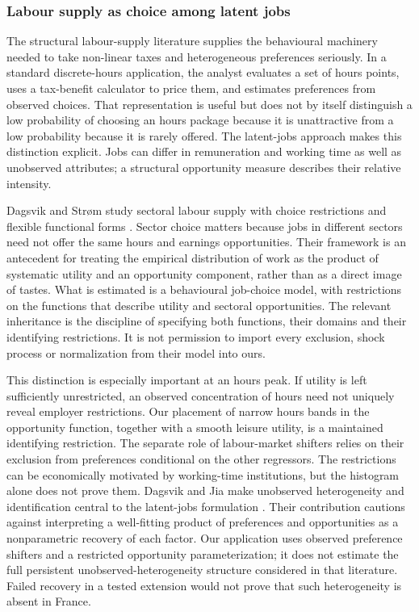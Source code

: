 \documentclass[11pt,a4paper]{article}
\begin{document}
\subsubsection{Labour supply as choice among latent jobs}\label{labour-supply-as-choice-among-latent-jobs}

The structural labour-supply literature supplies the behavioural machinery needed to take non-linear taxes and heterogeneous preferences seriously. In a standard discrete-hours application, the analyst evaluates a set of hours points, uses a tax-benefit calculator to price them, and estimates preferences from observed choices. That representation is useful but does not by itself distinguish a low probability of choosing an hours package because it is unattractive from a low probability because it is rarely offered. The latent-jobs approach makes this distinction explicit. Jobs can differ in remuneration and working time as well as unobserved attributes; a structural opportunity measure describes their relative intensity.

Dagsvik and Strøm study sectoral labour supply with choice restrictions and flexible functional forms \citep[model exposition]{dagsvikstrom2006}. Sector choice matters because jobs in different sectors need not offer the same hours and earnings opportunities. Their framework is an antecedent for treating the empirical distribution of work as the product of systematic utility and an opportunity component, rather than as a direct image of tastes. What is estimated is a behavioural job-choice model, with restrictions on the functions that describe utility and sectoral opportunities. The relevant inheritance is the discipline of specifying both functions, their domains and their identifying restrictions. It is not permission to import every exclusion, shock process or normalization from their model into ours.

This distinction is especially important at an hours peak. If utility is left sufficiently unrestricted, an observed concentration of hours need not uniquely reveal employer restrictions. Our placement of narrow hours bands in the opportunity function, together with a smooth leisure utility, is a maintained identifying restriction. The separate role of labour-market shifters relies on their exclusion from preferences conditional on the other regressors. The restrictions can be economically motivated by working-time institutions, but the histogram alone does not prove them. Dagsvik and Jia make unobserved heterogeneity and identification central to the latent-jobs formulation \citep{dagsvikjia2016}. Their contribution cautions against interpreting a well-fitting product of preferences and opportunities as a nonparametric recovery of each factor. Our application uses observed preference shifters and a restricted opportunity parameterization; it does not estimate the full persistent unobserved-heterogeneity structure considered in that literature. Failed recovery in a tested extension would not prove that such heterogeneity is absent in France.
\end{document}
